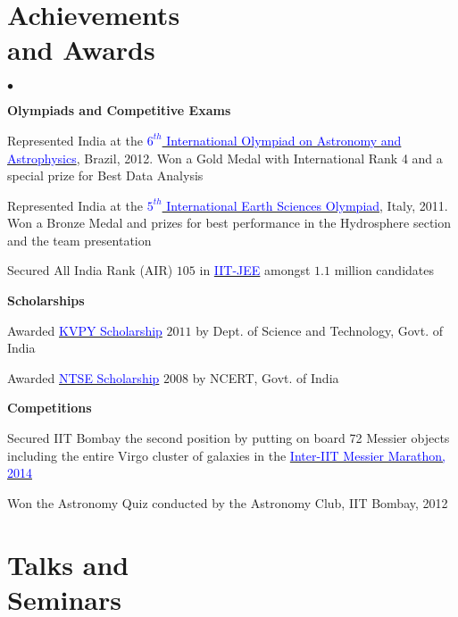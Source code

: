 \documentclass[margin,line]{res}
\newenvironment{list2}{
  \begin{list}{$\bullet$}{%
      \setlength{\itemsep}{0in}
      \setlength{\parsep}{0in} \setlength{\parskip}{0in}
      \setlength{\topsep}{0in} \setlength{\partopsep}{0in} 
      \setlength{\leftmargin}{0.2in}}}{\end{list}}
\begin{document}
\begin{resume}
\section{\sc Achievements \\and Awards}
\begin{list2}
\item[\strut\hspace{0.5cm}\textbf{Olympiads and Competitive Exams}]
\item Represented India at the \href{http://www.ioaa2012.ufrj.br/}{\textcolor{blue} {$6^{th}$ International Olympiad on Astronomy and Astrophysics}}, Brazil, 2012. Won a Gold Medal with International Rank 4 and a special prize for Best Data Analysis
\item Represented India at the \href{http://www.ieso2011.unimore.it/}{\textcolor{blue} {$5^{th}$ International Earth Sciences Olympiad}}, Italy, 2011. Won a Bronze Medal and prizes for best performance in the Hydrosphere section and the team presentation
\item  Secured All India Rank (AIR) $105$ in \href{https://en.wikipedia.org/wiki/Indian_Institute_of_Technology_Joint_Entrance_Examination}{\textcolor{blue}{IIT-JEE}} amongst $1.1$ million candidates
\vspace{0.05in}
\item[\strut\hspace{0.5cm}\textbf{Scholarships}]
\item Awarded \href{http://www.kvpy.iisc.ernet.in/main/index.htm}{\textcolor{blue}{KVPY Scholarship}} $2011$ by Dept. of Science and Technology, Govt. of India
\item Awarded \href{http://www.ncert.nic.in/programmes/talent_exam/index_talent.html}{\textcolor{blue}{NTSE Scholarship}} $2008$ by NCERT, Govt. of India
\item[\strut\hspace{0.5cm}\textbf{Competitions}]
\item Secured IIT Bombay the second position by putting on board 72 Messier objects including the entire Virgo cluster of galaxies in the \href{https://www.iitbombay.org/iitb_dean_acr/february-newsletter-2014/2nd\%20Annual\%20Inter.pdf}{\textcolor{blue} {Inter-IIT Messier Marathon, 2014}}
\item Won the Astronomy Quiz conducted by the Astronomy Club, IIT Bombay, 2012
\end{list2}

\section{\sc Talks and \\Seminars}


\end{resume}
\end{document}
